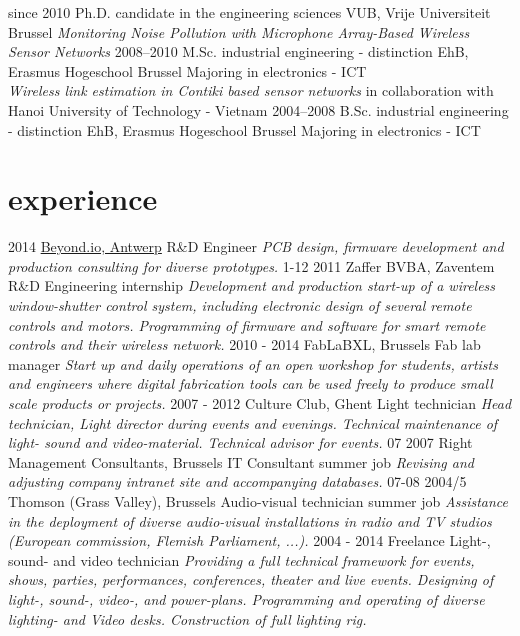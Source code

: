 \documentclass[]{friggeri-cv}
\begin{document}
\begin{entrylist}
  \entry
    {since 2010}
    {Ph.D. {\normalfont candidate in the engineering sciences}}
    {VUB, Vrije Universiteit Brussel}
    {\emph{Monitoring Noise Pollution with Microphone Array-Based Wireless Sensor Networks}}
  \entry
    {2008–2010}
    {M.Sc. {\normalfont industrial engineering - distinction}}
    {EhB, Erasmus Hogeschool Brussel}
    {Majoring in electronics - ICT\\
    \emph{Wireless link estimation in Contiki based sensor networks} in collaboration with Hanoi University of Technology - Vietnam}
  \entry
    {2004–2008}
    {B.Sc. {\normalfont industrial engineering - distinction}}
    {EhB, Erasmus Hogeschool Brussel}
    {Majoring in electronics - ICT}
\end{entrylist}

\section{experience}

\begin{entrylist}
  \entry
    {2014}
    {\href{http://beyond.io}{Beyond.io, Antwerp}}
    {R\&D Engineer}
    {\emph{PCB design, firmware development and production consulting for diverse prototypes.}}
  \entry
    {1-12 2011}
    {Zaffer BVBA, Zaventem}
    {R\&D Engineering internship}
    {\emph{Development and production start-up of a wireless window-shutter control system, including electronic design of several remote controls and motors. Programming of firmware and software for smart remote controls and their wireless network.}}
  \entry
    {2010 - 2014}
    {FabLaBXL, Brussels}
    {Fab lab manager}
    {\emph{Start up and daily operations of an open workshop for students, artists and engineers where digital fabrication tools can be used freely to produce small scale products or projects.}}
  \entry
    {2007 - 2012}
    {Culture Club, Ghent}
    {Light technician}
    {\emph{Head technician, Light director during events and evenings. Technical maintenance of light- sound and video-material. Technical advisor for events.}}
  \entry
    {07 2007}
    {Right Management Consultants, Brussels}
    {IT Consultant summer job}
    {\emph{Revising and adjusting company intranet site and accompanying databases.}}
  \entry
    {07-08 2004/5}
    {Thomson (Grass Valley), Brussels}
    {Audio-visual technician summer job}
    {\emph{Assistance in the deployment of diverse audio-visual installations in radio and TV studios (European commission, Flemish Parliament, ...).}}
  \entry
    {2004 - 2014}
    {Freelance}
    {Light-, sound- and video technician}
    {\emph{Providing a full technical framework for events, shows, parties, performances, conferences, theater and live events. Designing of light-, sound-, video-, and power-plans. Programming and operating of diverse lighting- and Video desks. Construction of full lighting rig.}}
\end{entrylist}
\end{document}
